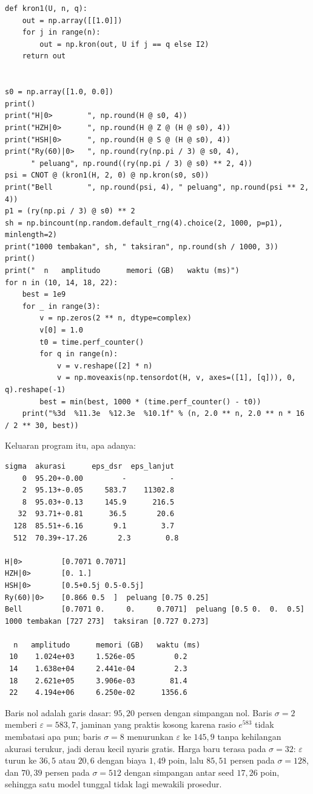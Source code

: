 \begin{lab}
\begin{verbatim}
def kron1(U, n, q):
    out = np.array([[1.0]])
    for j in range(n):
        out = np.kron(out, U if j == q else I2)
    return out


s0 = np.array([1.0, 0.0])
print()
print("H|0>        ", np.round(H @ s0, 4))
print("HZH|0>      ", np.round(H @ Z @ (H @ s0), 4))
print("HSH|0>      ", np.round(H @ S @ (H @ s0), 4))
print("Ry(60)|0>   ", np.round(ry(np.pi / 3) @ s0, 4),
      " peluang", np.round((ry(np.pi / 3) @ s0) ** 2, 4))
psi = CNOT @ (kron1(H, 2, 0) @ np.kron(s0, s0))
print("Bell        ", np.round(psi, 4), " peluang", np.round(psi ** 2, 4))
p1 = (ry(np.pi / 3) @ s0) ** 2
sh = np.bincount(np.random.default_rng(4).choice(2, 1000, p=p1), minlength=2)
print("1000 tembakan", sh, " taksiran", np.round(sh / 1000, 3))
print()
print("  n   amplitudo      memori (GB)   waktu (ms)")
for n in (10, 14, 18, 22):
    best = 1e9
    for _ in range(3):
        v = np.zeros(2 ** n, dtype=complex)
        v[0] = 1.0
        t0 = time.perf_counter()
        for q in range(n):
            v = v.reshape([2] * n)
            v = np.moveaxis(np.tensordot(H, v, axes=([1], [q])), 0, q).reshape(-1)
        best = min(best, 1000 * (time.perf_counter() - t0))
    print("%3d  %11.3e  %12.3e  %10.1f" % (n, 2.0 ** n, 2.0 ** n * 16 / 2 ** 30, best))
\end{verbatim}

Keluaran program itu, apa adanya:

\begin{verbatim}
sigma  akurasi      eps_dsr  eps_lanjut
    0  95.20+-0.00         -          -
    2  95.13+-0.05     583.7    11302.8
    8  95.03+-0.13     145.9      216.5
   32  93.71+-0.81      36.5       20.6
  128  85.51+-6.16       9.1        3.7
  512  70.39+-17.26       2.3        0.8

H|0>         [0.7071 0.7071]
HZH|0>       [0. 1.]
HSH|0>       [0.5+0.5j 0.5-0.5j]
Ry(60)|0>    [0.866 0.5  ]  peluang [0.75 0.25]
Bell         [0.7071 0.     0.     0.7071]  peluang [0.5 0.  0.  0.5]
1000 tembakan [727 273]  taksiran [0.727 0.273]

  n   amplitudo      memori (GB)   waktu (ms)
 10    1.024e+03     1.526e-05         0.2
 14    1.638e+04     2.441e-04         2.3
 18    2.621e+05     3.906e-03        81.4
 22    4.194e+06     6.250e-02      1356.6
\end{verbatim}
\end{lab}

Baris nol adalah garis dasar: $95{,}20$ persen dengan simpangan nol. Baris $\sigma=2$
memberi $\varepsilon=583{,}7$, jaminan yang praktis kosong karena rasio $e^{583}$ tidak
membatasi apa pun; baris $\sigma=8$ menurunkan $\varepsilon$ ke $145{,}9$ tanpa
kehilangan akurasi terukur, jadi derau kecil nyaris gratis. Harga baru terasa pada
$\sigma=32$: $\varepsilon$ turun ke $36{,}5$ atau $20{,}6$ dengan biaya $1{,}49$ poin,
lalu $85{,}51$ persen pada $\sigma=128$, dan $70{,}39$ persen pada $\sigma=512$ dengan
simpangan antar seed $17{,}26$ poin, sehingga satu model tunggal tidak lagi mewakili
prosedur.

